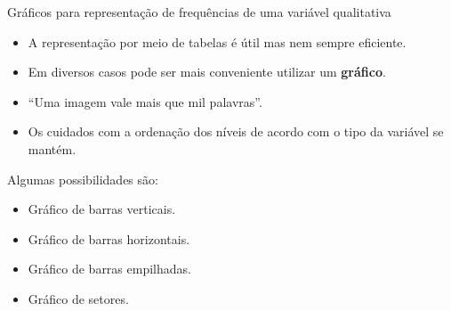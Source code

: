\documentclass[
  ignorenonframetext,
  serif,
  professionalfont,
  usenames,
  dvipsnames,
  aspectratio = 169]{beamer}
\providecommand{\tightlist}{%
  \setlength{\itemsep}{0pt}\setlength{\parskip}{0pt}}
\renewcommand{\tightlist}{%
  \setlength{\itemsep}{0\baselineskip}
  \setlength{\parskip}{0.25\baselineskip}
}
\def\beginAHalfColumn{\begin{minipage}{0.49\textwidth}}%
\def\endColumns{\end{minipage}}%
\begin{document}
\begin{frame}{Gráficos para representação de frequências de uma variável
qualitativa}
\label{gruxe1ficos-para-representauxe7uxe3o-de-frequuxeancias-de-uma-variuxe1vel-qualitativa}
\beginAHalfColumn

\begin{itemize}
\tightlist
\item
  A representação por meio de tabelas é útil mas nem sempre eficiente.
\end{itemize}

\vspace{0.3cm}

\begin{itemize}
\tightlist
\item
  Em diversos casos pode ser mais conveniente utilizar um
  \textbf{gráfico}.
\end{itemize}

\vspace{0.3cm}

\begin{itemize}
\tightlist
\item
  ``Uma imagem vale mais que mil palavras''.
\end{itemize}

\vspace{0.3cm}

\begin{itemize}
\tightlist
\item
  Os cuidados com a ordenação dos níveis de acordo com o tipo da
  variável se mantém.
\end{itemize}

\endColumns
\beginAHalfColumn

Algumas possibilidades são:

\begin{itemize}
\tightlist
\item
  Gráfico de barras verticais.
\item
  Gráfico de barras horizontais.
\item
  Gráfico de barras empilhadas.
\item
  Gráfico de setores.
\end{itemize}

\endColumns
\end{frame}
\end{document}

